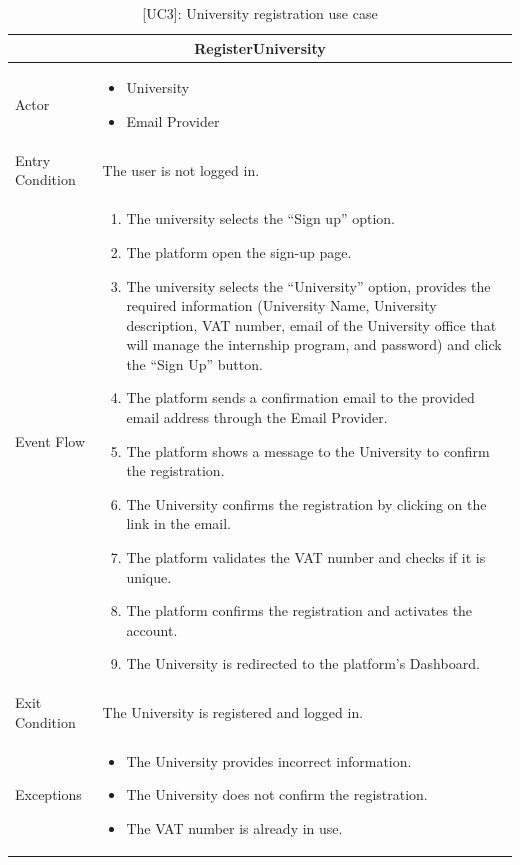 \begin{table}[H]
    \centering
    \begin{tabular}{|p{3cm}|p{12cm}|}
    \hline
    \multicolumn{2}{|c|}{\textbf{RegisterUniversity}} \\ \hline
    Actor & 
    \begin{itemize}
        \item University
        \item Email Provider
    \end{itemize} \\ \hline
    Entry Condition & The user is not logged in. \\ \hline
    Event Flow &
    \begin{enumerate}         
        \item The university selects the “Sign up” option.
        \item The platform open the sign-up page.
        \item The university selects the “University” option, provides the required information (University Name, University description, VAT number, email of the University office that will manage the internship program, and password) and click the “Sign Up” button.
        \item The platform sends a confirmation email to the provided email address through the Email Provider.
        \item The platform shows a message to the University to confirm the registration.
        \item The University confirms the registration by clicking on the link in the email.
        \item The platform validates the VAT number and checks if it is unique.
        \item The platform confirms the registration and activates the account.
        \item The University is redirected to the platform's Dashboard.
    \end{enumerate} \\ \hline
    Exit Condition & The University is registered and logged in.\\ \hline
    Exceptions &
    \begin{itemize}
        \item The University provides incorrect information.
        \item The University does not confirm the registration.
        \item The VAT number is already in use.
    \end{itemize} \\ \hline
    \end{tabular}
    \caption{[UC3]: University registration use case}
    \label{tab:UC3}
\end{table}

